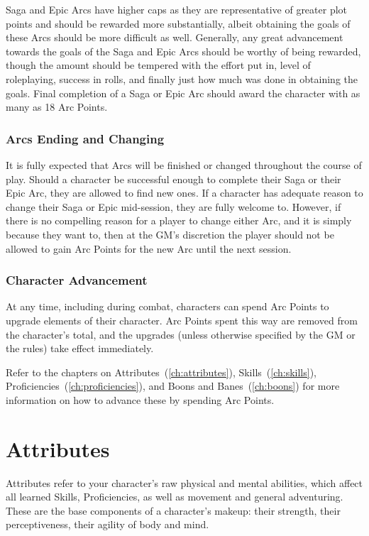 \documentclass[oneside,11pt,english]{book}
\begin{document}
Saga and Epic Arcs have higher caps as they are representative of greater plot points and should be 
rewarded more substantially, albeit obtaining the goals of these Arcs should be more difficult as well. 
Generally, any great advancement towards the goals of the Saga and Epic Arcs should be worthy of being 
rewarded, though the amount should be tempered with the effort put in, level of roleplaying, success in 
rolls, and finally just how much was done in obtaining the goals. Final completion of a Saga or Epic Arc 
should award the character with as many as 18 Arc Points. 


\subsection{Arcs Ending and Changing}
It is fully expected that Arcs will be finished or changed throughout the course of play. Should a character 
be successful enough to complete their Saga or their Epic Arc, they are allowed to find new ones. If a 
character has adequate reason to change their Saga or Epic mid-session, they are fully welcome to. 
However, if there is no compelling reason for a player to change either Arc, and it is simply because they 
want to, then at the GM’s discretion the player should not be allowed to gain Arc Points for the new Arc 
until the next session. 


\subsection{Character Advancement}
At any time, including during combat, characters can spend Arc Points to upgrade elements of their 
character. Arc Points spent this way are removed from the character’s total, and the upgrades (unless 
otherwise specified by the GM or the rules) take effect immediately. 


Refer to the chapters on Attributes~(\autoref{ch:attributes}), Skills~(\autoref{ch:skills}), Proficiencies~(\autoref{ch:proficiencies}), and Boons and Banes~(\autoref{ch:boons}) for more information on how to advance these by spending Arc Points. 
\chapter{Attributes}\label{ch:attributes}
\startcontents[chapters]
\clearpage
Attributes refer to your character’s raw physical and mental abilities, which affect all learned Skills, 
Proficiencies, as well as movement and general adventuring. These are the base components of a 
character’s makeup: their strength, their perceptiveness, their agility of body and mind. 
\end{document}
